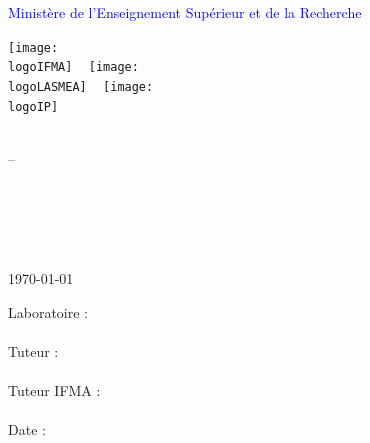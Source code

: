
\thispagestyle{empty}
\textcolor{blue}{Ministère de l'Enseignement Supérieur et de la Recherche}\\
\vspace{5mm}
\begin{centering}

  \texttt{[image: \\logoIFMA]} ~
  \texttt{[image: \\logoLASMEA]} ~
  \texttt{[image: \\logoIP]}

\end{centering}

\vspace{5mm}
\begin{center} 
\begin{large}
\textbf{\titre}
\end{large}
\\\vspace{3mm}--\vspace{3mm}\\
\begin{Huge}
\textbf{\sujet}
\end{Huge}
\\
\vspace{10mm}
\begin{LARGE}
\auteur\\

\vspace{5mm}
\annee\\
\end{LARGE}
\vspace{5mm}
\today
\end{center}

\begin{flushright}
	\begin{large}
		Laboratoire :\\
		
		\textbf{\lieu}\\
		
		\vspace{3mm}
		Tuteur :\\
		
		\textbf{\tuteur}\\
		
		\vspace{3mm}
		Tuteur IFMA :\\
		
		\textbf{\tuteurIFMA}\\
		
		\vspace{3mm}
		Date : \dates
	\end{large}
\end{flushright}

